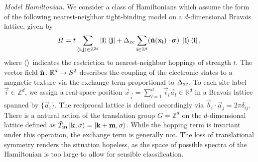 \documentclass[
    10pt,
    aps,
    prr,
    twocolumn,
    floatfix,
    superscriptaddress
]{revtex4-2}
\newcommand{\revise}[1]{{\color{red} #1}}
\begin{document}

\revise{{\it Model Hamiltonian.}} We consider a class of Hamiltonians which assume the form of the following nearest-neighbor tight-binding model on a $d$-dimensional Bravais lattice, given by
\begin{align}
    H  = t \sum_{\braket{\mathbf{i},\mathbf{j}} \in \mathbb{Z}^{2d}} \ket{\mathbf{i}}\bra{\mathbf{j}}
    + \Delta_\mathrm{xc}\sum_{\mathbf{i} \in \mathbb{Z}^d}  (\hat{\mathbf{n}} (\mathbf{x}_{\mathbf{i}}) \cdot \boldsymbol{\sigma}) ~ \ket{\mathbf{i}}\bra{\mathbf{i}} ,
    \label{eq:hamiltonian}
\end{align}
where $\braket{}$ indicates the restriction to nearest-neighbor hoppings of strength $t$.
The vector field $\hat{\mathbf{n}}\colon \mathbb{R}^d \to S^2$ describes the coupling of the electronic states to a magnetic texture via the exchange term proportional to $\Delta_\mathrm{xc}$. 
To each site label $\vec{i} \in \mathbb{Z}^d$, we assign a real-space position $\vec{x}_\vec{i} = \sum_{l=1}^d \vec{i}_l \vec{a}_l \in \mathbb{R}^d$ in a Bravais lattice spanned by $\lbrace \vec{a}_i \rbrace$. 
The reciprocal lattice is defined accordingly via $ \vec{b}_i \cdot \vec{a}_j  = 2\pi \delta_{ij}$.
There is a natural action of the translation group $G = \mathbb{Z}^d$ on the $d$-dimensional lattice defined as
$
    \hat{T}_{\mathbf{m}} \ket{\mathbf{k}, \sigma}  =  \ket{\mathbf{k}+ \mathbf{m}, \sigma}
$.
While the hopping term is invariant under this operation, the exchange term is generally not.
The loss of translational symmetry renders the situation hopeless, as the space of possible spectra of the Hamiltonian is too large to allow for sensible classification.
\end{document}
